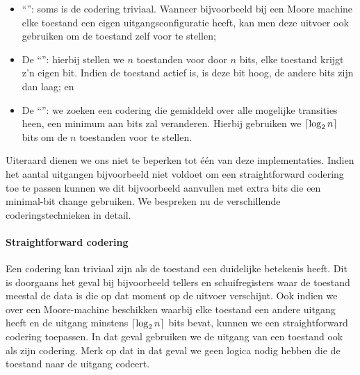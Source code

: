 \begin{itemize}
 \item ``'': soms is de codering triviaal. Wanneer bijvoorbeeld bij een Moore machine elke toestand een eigen uitgangsconfiguratie heeft, kan men deze uitvoer ook gebruiken om de toestand zelf voor te stellen;
 \item De ``'': hierbij stellen we $n$ toestanden voor door $n$ bits, elke toestand krijgt z'n eigen bit. Indien de toestand actief is, is deze bit hoog, de andere bits zijn dan laag; en
 \item De ``'': we zoeken een codering die gemiddeld over alle mogelijke transities heen, een minimum aan bits zal veranderen. Hierbij gebruiken we $\left\lceil \log_2 n \right\rceil$ bits om de $n$ toestanden voor te stellen.
\end{itemize}

Uiteraard dienen we ons niet te beperken tot \'e\'en van deze implementaties. Indien het aantal uitgangen bijvoorbeeld niet voldoet om een straightforward codering toe te passen kunnen we dit bijvoorbeeld aanvullen met extra bits die een minimal-bit change gebruiken. We bespreken nu de verschillende coderingstechnieken in detail.

\paragraph{Straightforward codering}
Een codering kan triviaal zijn als de toestand een duidelijke betekenis heeft. Dit is doorgaans het geval bij bijvoorbeeld tellers en schuifregisters waar de toestand meestal de data is die op dat moment op de uitvoer verschijnt. Ook indien we over een Moore-machine beschikken waarbij elke toestand een andere uitgang heeft en de uitgang minstens $\left\lceil \log_2 n \right\rceil$ bits bevat, kunnen we een straightforward codering toepassen. In dat geval gebruiken we de uitgang van een toestand ook als zijn codering. Merk op dat in dat geval we geen logica nodig hebben die de toestand naar de uitgang codeert.

